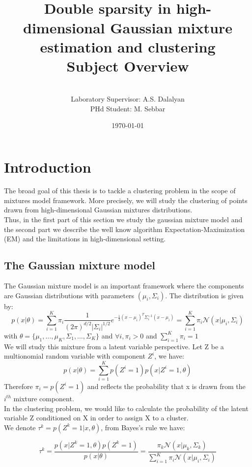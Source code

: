\documentclass[12pt]{article}
\title{\vspace{-60pt}~\\Double sparsity in high-dimensional Gaussian mixture estimation and clustering\\Subject Overview}
\author{\vspace{-20pt}~\\ Laboratory Supervisor: A.S. Dalalyan\\
PHd Student: M. Sebbar}
\date{\today}
\begin{document}
\maketitle
\tableofcontents
\newpage
\section{Introduction}
The broad goal of this thesis is to tackle a clustering problem in the scope of mixtures model framework. More precisely, we will study the clustering of points drawn from high-dimensional Gaussian mixtures distributions.\\Thus, in the first part of this section we study the gaussian mixture model and the second part we describe the well know algorithm Expectation-Maximization (EM) and the limitations in high-dimensional setting.
\subsection{The Gaussian mixture model}

The Gaussian mixture model is an important framework where the components are Gaussian distributions with parameters $(\mu_i,\Sigma_i)$. The distribution is given by:
\begin{equation}
p(x|\theta)=\sum_{i=1}^K\pi_i\frac{1}{(2\pi)^{d/2}|\Sigma_i|^{1/2}} e^{-\frac{1}{2}(x-\mu_i)^T\Sigma_i^{-1}(x-\mu_i)}=\sum_{i=1}^K\pi_i\mathcal N(x|\mu_i,\Sigma_i)
\end{equation}
with $\theta=\{\mu_1,\dots,\mu_K,\Sigma_1,\dots,\Sigma_K\}$ and $\forall i, \pi_i>0$ and $\sum_{i=1}^K\pi_i=1$
\\

We will study this mixture from a latent variable perspective. Let Z be a multionomial random variable with component $Z^i$, we have:
\begin{equation}
p(x|\theta)=\sum_{i=1}^K p(Z^i=1)p(x|Z^i=1,\theta)
\end{equation}
Therefore $\pi_i=p(Z^i=1)$ and reflects the probability that x is drawn from the $i^{th}$ mixture component.\\

In the clustering problem, we would like to calculate the probability of the latent variable Z conditioned on X in order to assign X to a cluster.\\
We denote $\tau^k=p(Z^k=1|x,\theta)$, from Bayes's rule we have:

\begin{equation}
\label{tau_bayes}
\tau^k=\frac{p(x|Z^k=1,\theta)p(Z^k=1)}{p(x|\theta)}=\frac{\pi_k \mathcal N(x|\mu_k,\Sigma_k)}{\sum_{i=1}^K\pi_i\mathcal N(x|\mu_i,\Sigma_i)}
\end{equation}
\end{document}
